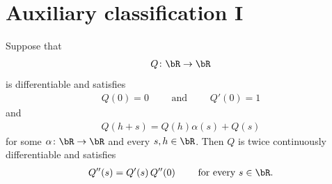 \section{Auxiliary classification I}

\begin{lemma}
  \label{lem:ode-of-order-two-for-Q}
  \leanok
  Suppose that
  \begin{align*}
  Q \colon \bR \to \bR
  \end{align*}
  is differentiable and satisfies
  \begin{align*}
  Q(0) = 0 \qquad \text{ and } \qquad Q'(0) = 1
  \end{align*}
  and
  \begin{align*}
  Q(h+s) = Q(h) \alpha(s) + Q(s)
  \end{align*}
  for some $\alpha \colon \bR \to \bR$ and every $s,h \in \bR$.
  Then $Q$ is twice continuously differentiable and satisfies
  \begin{align}
    Q''(s) = Q'(s) \, Q''(0) \qquad \text{ for every } s \in \bR .
  \end{align}
\end{lemma}
